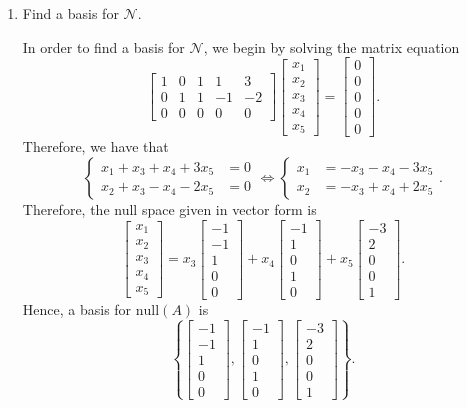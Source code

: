 \documentclass[letter]{article}
\newcommand{\Null}{\mathrm{null}}
\newcommand{\mat}[1]{\begin{bmatrix}#1\end{bmatrix}}
\newenvironment{answer}{
	\begin{adjustwidth}{8mm}{} \vspace{2mm}}{\end{adjustwidth} \vspace{2mm}
}
\theoremstyle{plain}
\theoremstyle{definition}
\theoremstyle{remark}
\begin{document}
\begin{enumerate}
\begin{enumerate}
\begin{answer}
\[				\]
			\end{answer}
			\item Find a basis for $\mathcal{N}$.
			\begin{answer}
				In order to find a basis for $\mathcal{N}$, we begin by solving the matrix equation
				\[
				\left[\begin{array}{ccccc}
					1 & 0 & 1 & 1 & 3 \\
					0 & 1 & 1 & -1 & -2 \\
					0 & 0 & 0 & 0 & 0
				\end{array}\right] \mat{x_1\\x_2\\x_3\\x_4\\x_5} = 
				\mat{0\\0\\0\\0\\0}.
				\]
				Therefore, we have that
				\[
				\begin{cases}
					x_1 + x_3 + x_4 + 3x_5 &= 0\\
					x_2 + x_3 - x_4 - 2x_5 &= 0
				\end{cases} \iff
				\begin{cases}
					x_1 &= -x_3 - x_4 - 3x_5 \\
					x_2 &= -x_3 + x_4 + 2x_5
				\end{cases}.
				\]
				Therefore, the null space given in vector form is
				\[
				\mat{x_1\\x_2\\x_3\\x_4\\x_5} = x_3\mat{-1\\-1\\1\\0\\0} + x_4\mat{-1\\1\\0\\1\\0} + x_5\mat{-3\\2\\0\\0\\1}.
				\]
				Hence, a basis for $\Null(A)$ is 
				\[
				\left\{\mat{-1\\-1\\1\\0\\0}, \mat{-1\\1\\0\\1\\0}, \mat{-3\\2\\0\\0\\1}\right\}.
\]
\end{answer}
\end{enumerate}
\end{enumerate}
\end{document}

